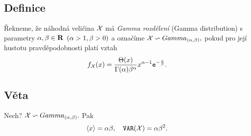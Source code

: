 \subsection{Definice}
Řekneme, že náhodná veličina ${\mathcal X}$ má \emph{Gamma rozdělení} (Gamma
distribution) s parametry $\alpha, \beta \in {\mathbf R}$ $(\alpha> 1, \beta>0)$ a označíme  ${\mathcal X}
\backsim Gamma_{(\alpha,\beta)},$ pokud pro její hustotu pravděpodobnosti
platí vztah $$ f_{\mathcal X}(x) = \frac{\Theta(x)}{\Gamma(\alpha) \beta^{\alpha}}x^{\alpha-1}\mathtt{e}^{-\frac{x}{\beta}}.$$


\subsection{Věta}
Nech? ${\mathcal X} \backsim Gamma_{(\alpha,\beta)}.$ Pak $$\langle x \rangle = \alpha
\beta, \quad \mathtt{VAR}({\mathcal X})=\alpha \beta^{2}.$$

\Proof

